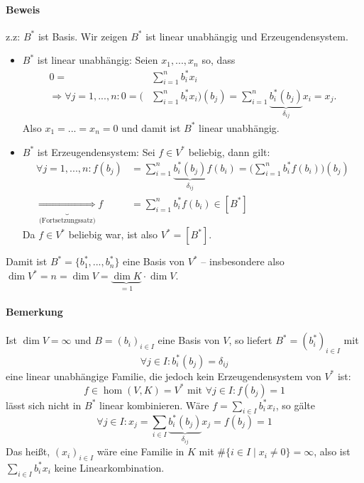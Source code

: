  	\paragraph{Beweis} z.z: $B^*$ ist Basis. Wir zeigen $B^*$ ist linear unabhängig und Erzeugendensystem.
 		\begin{itemize}
 			\item $ B^* $ ist linear unabhängig: Seien $ x_1,...,x_n $ so, dass
 			      \begin{align*}
 			      	0 =                                      & \sum_{i=1}^{n}b_i^*x_i                                                                           \\
 			      	\Rightarrow \forall j=1,...,n: 0 = \Big( & \sum_{i=1}^{n}b_i^*x_i\Big)(b_j) = \sum_{i=1}^{n}\underbrace{b_i^*(b_j)}_{\delta_{ij}}x_i = x_j.
 			      \end{align*}
 			      Also $ x_1 = ... = x_n = 0 $ und damit ist $ B^* $ linear unabhängig.
 			\item $ B^* $ ist Erzeugendensystem: Sei $ f\in V^* $ beliebig, dann gilt:
 			      \begin{align*}
 			      	\forall j = 1,...,n:f(b_j)                             & = \sum_{i=1}^{n}\underbrace{b_i^*(b_j)}_{\delta_{ij}}f(b_i) = \Big(\sum_{i=1}^{n}b_i^*f(b_i)\Big)(b_j) \\
 			      	\underbrace{\Rightarrow}_{\text{(Fortsetzungssatz)}} f & = \sum_{i=1}^{n}b_i^*f(b_i)\in [B^*]
 			      \end{align*}
 			      Da $ f\in V^* $ beliebig war, ist also $ V^* = [B^*]$.
 		\end{itemize}
 		Damit ist $ B^* = \{b_1^*,...,b_n^*\}$ eine Basis von $ V^* $ -- insbesondere also $ \dim V^* = n = \dim V = \underbrace{\dim K}_{=1}\cdot \dim V $.

 	\paragraph{Bemerkung}
 		Ist $\dim V = \infty$ und $B=(b_i)_{i\in I}$ eine Basis von $V$, so liefert $B^\ast=(b_i^\ast)_{i\in I}$ mit
 		\[
 			\forall j\in I:b_i^\ast(b_j)=\delta_{ij}
 		\]
 		eine linear unabhängige Familie, die jedoch kein Erzeugendensystem von $V^\ast$ ist:
 		\[
 			f\in\hom(V,K)=V^\ast \text{ mit } \forall j\in I:f(b_j)=1
 		\]
 		lässt sich nicht in $B^\ast$ linear kombinieren. Wäre $f=\sum_{i\in I}b_i^\ast x_i$, so gälte
 		\[
 			\forall j\in I: x_j =\sum_{i\in I}\underbrace{b_i^\ast(b_j)}_{\delta_{ij}}x_j = f(b_j) = 1
 		\]
 		Das heißt, $(x_i)_{i\in I}$ wäre eine Familie in $ K $ mit $\#\{i\in I\mid x_i\neq 0\}=\infty$, also ist $\sum_{i\in I}b_i^\ast x_i$ keine Linearkombination.

